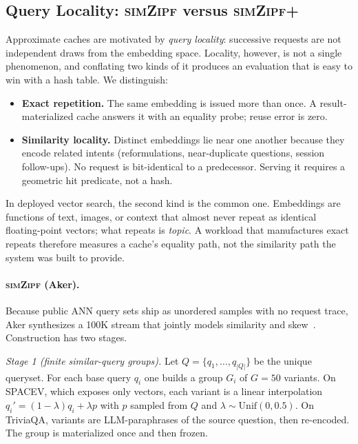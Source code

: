
\subsection{Query Locality: \textsc{simZipf} versus \textsc{simZipf+}}
\label{sec:simzipf}

Approximate caches are motivated by \emph{query locality}: successive
requests are not independent draws from the embedding space.
Locality, however, is not a single phenomenon, and conflating two
kinds of it produces an evaluation that is easy to win with a hash
table. We distinguish:

\begin{itemize}
  \item \textbf{Exact repetition.} The same embedding is issued more
        than once. A result-materialized cache answers it with an
        equality probe; reuse error is zero.
  \item \textbf{Similarity locality.} Distinct embeddings lie near
        one another because they encode related intents (reformulations,
        near-duplicate questions, session follow-ups). No request is
        bit-identical to a predecessor. Serving it requires a geometric
        hit predicate, not a hash.
\end{itemize}

In deployed vector search, the second kind is the common one.
Embeddings are functions of text, images, or context that almost never
repeat as identical floating-point vectors; what repeats is
\emph{topic}. A workload that manufactures exact repeats therefore
measures a cache's equality path, not the similarity path the system
was built to provide.

\paragraph{\textsc{simZipf} (Aker).}
Because public ANN query sets ship as unordered samples with no request
trace, Aker synthesizes a 100K stream that jointly models similarity
and skew~\cite{aker}. Construction has two stages.

\emph{Stage 1 (finite similar-query groups).}
Let $Q=\{q_1,\dots,q_{|Q|}\}$ be the unique queryset. For each base
query $q_i$ one builds a group $G_i$ of $G{=}50$ variants. On SPACEV,
which exposes only vectors, each variant is a linear interpolation
$q_i'=(1-\lambda)q_i+\lambda p$ with $p$ sampled from $Q$ and
$\lambda\sim\mathrm{Unif}(0,0.5)$. On TriviaQA, variants are
LLM-paraphrases of the source question, then re-encoded. The group is
materialized once and then frozen.

